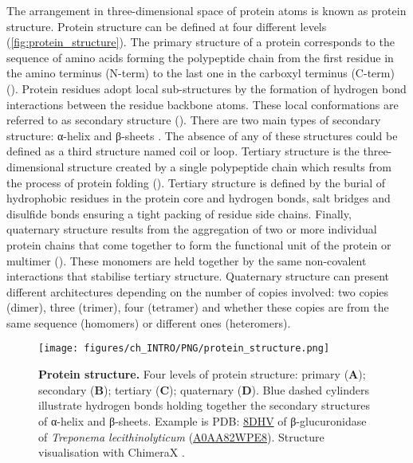 The arrangement in three-dimensional space of protein atoms is known as protein structure. Protein structure can be defined at four different levels (\autoref{fig:protein_structure}). The primary structure of a protein corresponds to the sequence of amino acids forming the polypeptide chain from the first residue in the amino terminus (N-term) to the last one in the carboxyl terminus (C-term) (). Protein residues adopt local sub-structures by the formation of hydrogen bond interactions between the residue backbone atoms. These local conformations are referred to as secondary structure (). There are two main types of secondary structure: α-helix and β-sheets \cite{PAULING_1951_SS}. The absence of any of these structures could be defined as a third structure named coil or loop. Tertiary structure is the three-dimensional structure created by a single polypeptide chain which results from the process of protein folding (). Tertiary structure is defined by the burial of hydrophobic residues in the protein core and hydrogen bonds, salt bridges and disulfide bonds ensuring a tight packing of residue side chains. Finally, quaternary structure results from the aggregation of two or more individual protein chains that come together to form the functional unit of the protein or multimer (). These monomers are held together by the same non-covalent interactions that stabilise tertiary structure. Quaternary structure can present different architectures depending on the number of copies involved: two copies (dimer), three (trimer), four (tetramer) and whether these copies are from the same sequence (homomers) or different ones (heteromers).

\begin{figure}[htb!]
    \centering
    \texttt{[image: figures/ch\_INTRO/PNG/protein\_structure.png]}
    \caption[Protein structure]{\textbf{Protein structure.} Four levels of protein structure: primary (\textbf{A}); secondary (\textbf{B}); tertiary (\textbf{C}); quaternary (\textbf{D}). Blue dashed cylinders illustrate hydrogen bonds holding together the secondary structures of α-helix and β-sheets. Example is PDB: \href{https://www.ebi.ac.uk/pdbe/entry/pdb/8dhv}{8DHV} \cite{LIETZAN_2023_BETAGLUCO} of β-glucuronidase of \textit{Treponema lecithinolyticum} (\href{https://www.uniprot.org/uniprotkb/A0AA82WPE8/entry}{A0AA82WPE8}). Structure visualisation with ChimeraX \cite{PETTERSEN_2021_CHIMERAX}.}
    \label{fig:protein_structure}
\end{figure}

